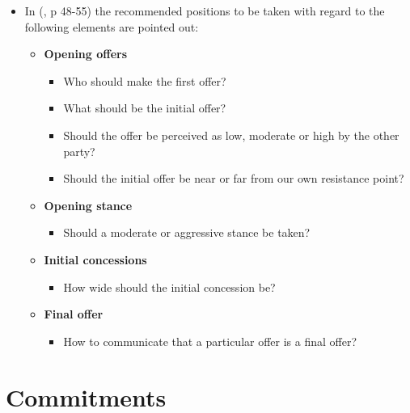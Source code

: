 \documentclass[
  ignorenonframetext,
]{beamer}
\providecommand{\tightlist}{%
  \setlength{\itemsep}{0pt}\setlength{\parskip}{0pt}}\usepackage{longtable,booktabs,array}
\begin{document}
\begin{frame}{}
\label{section-12}
\begin{itemize}
\item
  In (, p 48-55) the recommended positions to be
  taken with regard to the following elements are pointed out:

  \begin{itemize}
  \item
    \textbf{Opening offers}

    \begin{itemize}
    \tightlist
    \item
      Who should make the first offer?
    \item
      What should be the initial offer?
    \item
      Should the offer be perceived as low, moderate or high by the
      other party?
    \item
      Should the initial offer be near or far from our own resistance
      point?
    \end{itemize}
  \item
    \textbf{Opening stance}

    \begin{itemize}
    \tightlist
    \item
      Should a moderate or aggressive stance be taken?
    \end{itemize}
  \item
    \textbf{Initial concessions}

    \begin{itemize}
    \tightlist
    \item
      How wide should the initial concession be?
    \end{itemize}
  \item
    \textbf{Final offer}

    \begin{itemize}
    \tightlist
    \item
      How to communicate that a particular offer is a final offer?
    \end{itemize}
  \end{itemize}
\end{itemize}
\end{frame}

\section{Commitments}\label{commitments}
\end{document}
